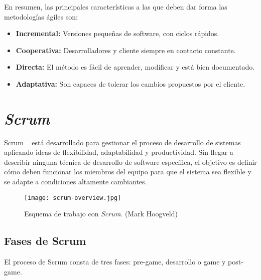 En resumen, las principales características a las que deben dar forma las metodologías ágiles son:
\begin{itemize}
\item \textbf{Incremental:} Versiones pequeñas de software, con ciclos rápidos. 
\item \textbf{Cooperativa:} Desarrolladores y cliente siempre en contacto constante.
\item \textbf{Directa:} El método es fácil de aprender, modificar y está bien documentado.
\item \textbf{Adaptativa:} Son capaces de tolerar los cambios propuestos por el cliente.
\end{itemize}
\section{\textit{Scrum}}
Scrum ~\cite{Ubeda} está desarrollado para gestionar el proceso de desarrollo de sistemas aplicando ideas de flexibilidad, adaptabilidad y productividad. Sin llegar a describir ninguna técnica de desarrollo de software específica, el objetivo es definir cómo deben funcionar los miembros del equipo para que el sistema sea flexible y se adapte a condiciones altamente cambiantes.
 
\begin{figure}[t] 
  \centering
  \texttt{[image: scrum-overview.jpg]}
  \caption{Esquema de trabajo con \textit{Scrum}. (Mark Hoogveld)}
  \label{fig:scrum}
\end{figure}

\subsection{Fases de Scrum}
El proceso de Scrum consta de tres fases: pre-game, desarrollo o game y post-game.

